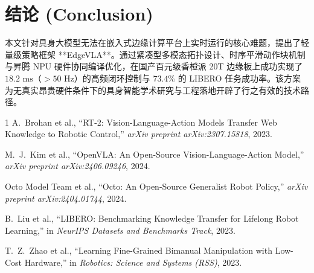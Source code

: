 \documentclass[UTF8,10pt,twocolumn]{ctexart}
\begin{document}
\begin{table}[htbp]
\centering
\small
\caption{不同量化精度在 Ascend 310B NPU 上的资源与成功率对比}
\label{tab:ablation_quant}
\end{table}

\section{结论 (Conclusion)}
本文针对具身大模型无法在嵌入式边缘计算平台上实时运行的核心难题，提出了轻量级策略框架 **EdgeVLA**。通过紧凑型多模态拓扑设计、时序平滑动作块机制与昇腾 NPU 硬件协同编译优化，在国产百元级香橙派 20T 边缘板上成功实现了 $18.2\text{ ms}$（$>50\text{ Hz}$）的高频闭环控制与 $73.4\%$ 的 LIBERO 任务成功率。该方案为无真实昂贵硬件条件下的具身智能学术研究与工程落地开辟了行之有效的技术路径。

\begin{thebibliography}{1}
A.~Brohan et al., ``RT-2: Vision-Language-Action Models Transfer Web Knowledge to Robotic Control,'' \textit{arXiv preprint arXiv:2307.15818}, 2023.

M.~J.~Kim et al., ``OpenVLA: An Open-Source Vision-Language-Action Model,'' \textit{arXiv preprint arXiv:2406.09246}, 2024.

Octo Model Team et al., ``Octo: An Open-Source Generalist Robot Policy,'' \textit{arXiv preprint arXiv:2404.01744}, 2024.

B.~Liu et al., ``LIBERO: Benchmarking Knowledge Transfer for Lifelong Robot Learning,'' in \textit{NeurIPS Datasets and Benchmarks Track}, 2023.

T.~Z.~Zhao et al., ``Learning Fine-Grained Bimanual Manipulation with Low-Cost Hardware,'' in \textit{Robotics: Science and Systems (RSS)}, 2023.
\end{thebibliography}
\end{document}

